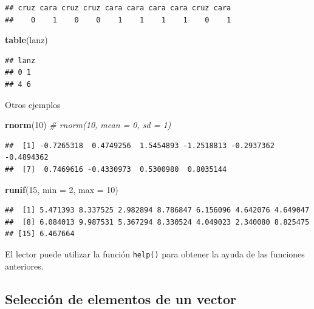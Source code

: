 \documentclass[]{book}
\newenvironment{Shaded}{\begin{snugshade}}{\end{snugshade}}
\newcommand{\KeywordTok}[1]{\textcolor[rgb]{0.13,0.29,0.53}{\textbf{#1}}}
\newcommand{\DataTypeTok}[1]{\textcolor[rgb]{0.13,0.29,0.53}{#1}}
\newcommand{\DecValTok}[1]{\textcolor[rgb]{0.00,0.00,0.81}{#1}}
\newcommand{\CommentTok}[1]{\textcolor[rgb]{0.56,0.35,0.01}{\textit{#1}}}
\newcommand{\NormalTok}[1]{#1}
\begin{document}
\begin{verbatim}
## cruz cara cruz cruz cara cara cara cara cruz cara 
##    0    1    0    0    1    1    1    1    0    1
\end{verbatim}

\begin{Shaded}
\begin{Highlighting}[]
\KeywordTok{table}\NormalTok{(lanz)}
\end{Highlighting}
\end{Shaded}

\begin{verbatim}
## lanz
## 0 1 
## 4 6
\end{verbatim}

Otros ejemplos

\begin{Shaded}
\begin{Highlighting}[]
\KeywordTok{rnorm}\NormalTok{(}\DecValTok{10}\NormalTok{)  }\CommentTok{# rnorm(10, mean = 0, sd = 1)}
\end{Highlighting}
\end{Shaded}

\begin{verbatim}
##  [1] -0.7265318  0.4749256  1.5454893 -1.2518813 -0.2937362 -0.4894362
##  [7]  0.7469616 -0.4330973  0.5300980  0.8035144
\end{verbatim}

\begin{Shaded}
\begin{Highlighting}[]
\KeywordTok{runif}\NormalTok{(}\DecValTok{15}\NormalTok{, }\DataTypeTok{min =} \DecValTok{2}\NormalTok{, }\DataTypeTok{max =} \DecValTok{10}\NormalTok{)}
\end{Highlighting}
\end{Shaded}

\begin{verbatim}
##  [1] 5.471393 8.337525 2.982894 8.786847 6.156096 4.642076 4.649047
##  [8] 6.084013 9.987531 5.367294 8.330524 4.049023 2.340080 8.825475
## [15] 6.467664
\end{verbatim}

El lector puede utilizar la función \texttt{help()} para obtener la
ayuda de las funciones anteriores.

\subsection{Selección de elementos de un
vector}\label{seleccion-de-elementos-de-un-vector}
\end{document}
